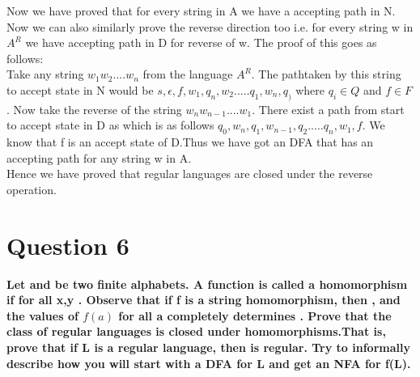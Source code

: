 \documentclass{article}
\begin{document}
Now we have proved that for every string in A we have a accepting path in N. Now we can also similarly prove the reverse 
direction too i.e. for every string w in $A^R$ we have accepting path in D for reverse of w. The proof of this goes as 
follows:\\ Take any string $w_1 w_2....w_n$ from the language $A^R$. The pathtaken by this string to accept state in N 
would be $s,\epsilon,f,w_1,q_n,w_2.....q_1,w_n,q_)$ where $q_i\in Q$ and $f\in F$. Now take the reverse of the string $w_n 
w_{n-1}....w_1$. There exist a path from start to accept state in D as which is as follows $q_0,w_n,q_1,w_{n-1},q_2.....q_n,w_1,
f$. We know that f is an accept state of D.Thus we have got an DFA that has an accepting path for any string w in A.\\
Hence we have proved that regular languages are closed under the reverse operation. 


\pagebreak
\section{Question 6}

\textbf{Let \boldsymbol{$\Sigma$} and \boldsymbol{$\Gamma$} be two finite alphabets. A function is called a homomorphism if
for all x,y . Observe that if f is a string homomorphism, then
, and the values of $f(a)$ for all a \boldsymbol{$\in \Sigma$} completely determines . Prove that the class of
regular languages is closed under homomorphisms.That is, prove that if L \boldsymbol{$\subseteq \Sigma^{*} $} is a regular
language, then  is regular. Try to informally describe how you
will start with a DFA for L and get an NFA for f(L).
}
\end{document}
